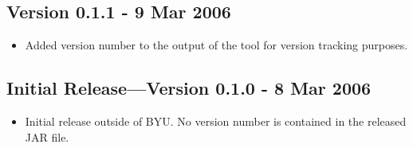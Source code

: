 \documentclass[english]{article}
\begin{document}
\subsection*{Version 0.1.1 - 9 Mar 2006}
\begin{itemize}
\item Added version number to the output of the tool for version tracking
purposes.
\end{itemize}

\subsection*{Initial Release---Version 0.1.0 - 8 Mar 2006}
\begin{itemize}
\item Initial release outside of BYU\@. No version number is contained in
the released JAR file.
\end{itemize}
\end{document}
